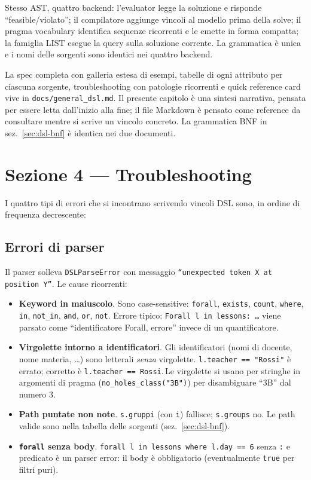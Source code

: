 Stesso AST, quattro backend: l'evaluator legge la soluzione e
risponde ``feasible/violato''; il compilatore aggiunge vincoli
al modello prima della solve; il pragma vocabulary identifica
sequenze ricorrenti e le emette in forma compatta; la famiglia
LIST esegue la query sulla soluzione corrente. La grammatica
\`e unica e i nomi delle sorgenti sono identici nei quattro
backend.

\begin{biblioparvabox}[title={Reference completo del DSL}]
La spec completa con galleria estesa di esempi, tabelle di
ogni attributo per ciascuna sorgente, troubleshooting con
patologie ricorrenti e quick reference card vive in
\texttt{docs/general\_dsl.md}. Il presente capitolo \`e una
sintesi narrativa, pensata per essere letta dall'inizio alla
fine; il file Markdown \`e pensato come reference da consultare
mentre si scrive un vincolo concreto. La grammatica BNF in
sez.~\ref{sec:dsl-bnf} \`e identica nei due documenti.
\end{biblioparvabox}

\section{Sezione 4 --- Troubleshooting}
\label{sec:dsl-troubleshooting}

I quattro tipi di errori che si incontrano scrivendo vincoli DSL
sono, in ordine di frequenza decrescente:

\subsection{Errori di parser}

Il parser solleva \texttt{DSLParseError} con messaggio
\texttt{``unexpected token X at position Y''}. Le cause
ricorrenti:

\begin{itemize}
\item \textbf{Keyword in maiuscolo}. Sono case-sensitive:
  \texttt{forall}, \texttt{exists}, \texttt{count},
  \texttt{where}, \texttt{in}, \texttt{not\_in},
  \texttt{and}, \texttt{or}, \texttt{not}. Errore tipico:
  \texttt{Forall l in lessons: \dots} viene parsato come
  ``identificatore Forall, errore'' invece di un quantificatore.
\item \textbf{Virgolette intorno a identificatori}. Gli
  identificatori (nomi di docente, nome materia, \dots) sono
  letterali \emph{senza} virgolette. \texttt{l.teacher == "Rossi"}
  \`e errato; corretto \`e \texttt{l.teacher == Rossi}.\,Le
  virgolette si usano per stringhe in argomenti di pragma
  (\texttt{no\_holes\_class("3B")}) per disambiguare ``3B'' dal
  numero 3.
\item \textbf{Path puntate non note}. \texttt{s.gruppi} (con
  \texttt{i}) fallisce; \texttt{s.groups} no. Le path valide
  sono nella tabella delle sorgenti (sez.~\ref{sec:dsl-bnf}).
\item \textbf{\texttt{forall} senza body}. \texttt{forall l in
  lessons where l.day == 6} senza \texttt{:} e predicato \`e
  un parser error: il body \`e obbligatorio (eventualmente
  \texttt{true} per filtri puri).
\end{itemize}

